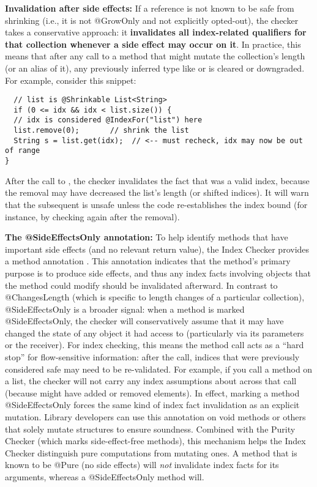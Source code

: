\textbf{Invalidation after side effects:}
If a reference is not known to be safe from shrinking (i.e., it is not @GrowOnly and not
explicitly opted-out), the checker takes a conservative approach: it
\textbf{invalidates all index-related qualifiers for that collection whenever a side effect may occur on it}.
In practice, this means that after any call to a method that might mutate the collection’s
length (or an alias of it), any previously inferred type like  or
 is cleared or downgraded. For example, consider this snippet:

\begin{Verbatim}
  // list is @Shrinkable List<String>
  if (0 <= idx && idx < list.size()) {
  // idx is considered @IndexFor("list") here
  list.remove(0);       // shrink the list
  String s = list.get(idx);  // <-- must recheck, idx may now be out of range
}
\end{Verbatim}

After the call to , the checker invalidates the fact that 
was a valid index, because the removal may have decreased the list’s length (or shifted indices).
It will warn that the subsequent  is unsafe unless the code re-establishes
the index bound (for instance, by checking  again after the removal).

\textbf{The @SideEffectsOnly annotation:} To help identify methods that have important side effects
(and no relevant return value), the Index Checker provides a method annotation .
This annotation indicates that the method’s primary purpose is to produce side effects, and thus any
index facts involving objects that the method could modify should be invalidated afterward. In
contrast to @ChangesLength (which is specific to length changes of a particular collection),
@SideEffectsOnly is a broader signal: when a method is marked @SideEffectsOnly, the checker will
conservatively assume that it may have changed the state of any object it had access to (particularly
via its parameters or the receiver). For index checking, this means the method call acts as a “hard stop”
for flow-sensitive information: after the call, indices that were previously considered safe may need to
be re-validated. For example, if you call a method  on
a list, the checker will not carry any index assumptions about  across that call (because
 might have added or removed elements). In effect, marking a method @SideEffectsOnly
forces the same kind of index fact invalidation as an explicit mutation. Library developers can use this
annotation on void methods or others that solely mutate structures to ensure soundness. Combined with the
Purity Checker (which marks side-effect-free methods), this mechanism helps the Index Checker distinguish
pure computations from mutating ones. A method that is known to be @Pure (no side effects) will \emph{not}
invalidate index facts for its arguments, whereas a @SideEffectsOnly method will.

